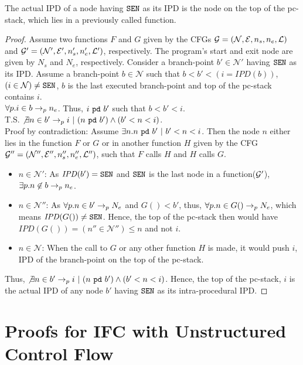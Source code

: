 \begin{myThm}\label{app:thm2:exc}
The actual IPD of a node having $\texttt{SEN}$ as its IPD is the node on
the top of the pc-stack, which lies in a previously called function.
\end{myThm}
\begin{proof}
Assume two functions $F$ and $G$ given by the CFGs $\mathcal{G} =
(\mathcal{N}, \mathcal{E}, n_s, n_e, \mathcal{L})$ and $\mathcal{G}' =
(\mathcal{N}', \mathcal{E}', n'_s, n'_e, \mathcal{L}')$,
respectively. The program's start and exit node are given by $N_s$ and
$N_e$, respectively. Consider a branch-point $b' \in \mathcal{N}'$ having
$\texttt{SEN}$ as its IPD. Assume a branch-point $b \in \mathcal{N}$ such
that $b < b' < (i = \mathit{IPD}(b))$, $(i \in \mathcal{N}) \neq
\texttt{SEN}$, $b$ is the last executed branch-point and 
 top of the pc-stack contains $i$. \\
$\forall p.i \in b \rightarrow_p n_e$. Thus, $i~\texttt{pd}~b'$
such that $b < b' < i$. \\
T.S. $\not\exists n \in b' \rightarrow_p i~|~(n~\texttt{pd}~b')
\wedge (b' < n < i)$. \\
Proof by contradiction:
Assume $\exists n.n~\texttt{pd}~b'~|~b' < n < i$. Then the node $n$ either lies in the
function $F$ or $G$ or in another function $H$ given by the CFG $\mathcal{G}'' =
(\mathcal{N}'', \mathcal{E}'', n''_s, n''_e, \mathcal{L}'')$, such
that $F$ calls $H$ and $H$ calls $G$.
\begin{itemize}
\item $n \in \mathcal{N}'$: As $\mathit{IPD}(b') = \texttt{SEN}$ and $\texttt{SEN}$ is
  the last node in a function($\mathcal{G}'$), $\exists p.n \not\in b \rightarrow_p n_e$. 
\item $n \in \mathcal{N}''$: As $\forall p. n \in b' \rightarrow_p N_e$ and
  $G() < b'$, thus, $\forall p. n \in G() \rightarrow_p N_e$,
  which means $\mathit{IPD}(G()) \neq \texttt{SEN}$. Hence, the top of the
  pc-stack then would have $\mathit{IPD}(G()) = (n'' \in
  \mathcal{N}'') \leq n$ and   not $i$.
\item $n \in \mathcal{N}$: When the call to $G$ or any other
  function $H$ is made, it would push $i$, IPD of the branch-point on
  the top of the  pc-stack.
\end{itemize}
Thus, $\not\exists n \in b' \rightarrow_p i~|~(n~\texttt{pd}~b')
\wedge (b' < n < i)$. Hence, the top of the pc-stack, $i$ is the
actual IPD of any node $b'$ having $\texttt{SEN}$ as its intra-procedural IPD. 
\end{proof}

\clearpage
\section{Proofs for IFC with Unstructured Control Flow}
\label{app:exc}

